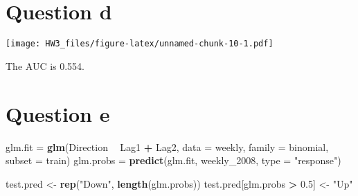 \documentclass[]{article}
\newenvironment{Shaded}{\begin{snugshade}}{\end{snugshade}}
\newcommand{\KeywordTok}[1]{\textcolor[rgb]{0.13,0.29,0.53}{\textbf{#1}}}
\newcommand{\DataTypeTok}[1]{\textcolor[rgb]{0.13,0.29,0.53}{#1}}
\newcommand{\DecValTok}[1]{\textcolor[rgb]{0.00,0.00,0.81}{#1}}
\newcommand{\FloatTok}[1]{\textcolor[rgb]{0.00,0.00,0.81}{#1}}
\newcommand{\StringTok}[1]{\textcolor[rgb]{0.31,0.60,0.02}{#1}}
\newcommand{\OtherTok}[1]{\textcolor[rgb]{0.56,0.35,0.01}{#1}}
\newcommand{\OperatorTok}[1]{\textcolor[rgb]{0.81,0.36,0.00}{\textbf{#1}}}
\newcommand{\NormalTok}[1]{#1}
\begin{document}
\section{Question d}\label{question-d}

\begin{Shaded}
\end{Shaded}

\texttt{[image: HW3\_files/figure-latex/unnamed-chunk-10-1.pdf]}

The AUC is 0.554.

\section{Question e}\label{question-e}

\begin{Shaded}
\end{Shaded}

\begin{Shaded}
\begin{Highlighting}[]
\NormalTok{glm.fit =}\StringTok{ }\KeywordTok{glm}\NormalTok{(Direction }\OperatorTok{~}\StringTok{ }\NormalTok{Lag1 }\OperatorTok{+}\StringTok{ }\NormalTok{Lag2, }\DataTypeTok{data =}\NormalTok{ weekly, }\DataTypeTok{family =}\NormalTok{ binomial, }\DataTypeTok{subset =}\NormalTok{ train)}
\NormalTok{glm.probs =}\StringTok{ }\KeywordTok{predict}\NormalTok{(glm.fit, weekly_}\DecValTok{2008}\NormalTok{, }\DataTypeTok{type =} \StringTok{"response"}\NormalTok{)}

\NormalTok{test.pred <-}\StringTok{ }\KeywordTok{rep}\NormalTok{(}\StringTok{"Down"}\NormalTok{, }\KeywordTok{length}\NormalTok{(glm.probs))}
\NormalTok{test.pred[glm.probs }\OperatorTok{>}\StringTok{ }\FloatTok{0.5}\NormalTok{] <-}\StringTok{ "Up"}
\end{Highlighting}
\end{Shaded}
\end{document}
